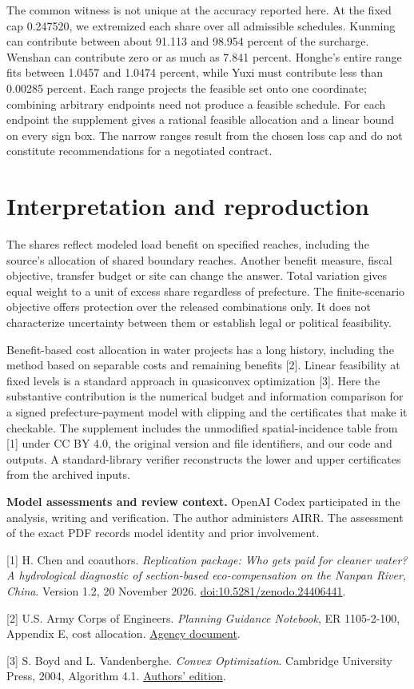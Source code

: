 \documentclass[11pt]{article}
\begin{document}
The common witness is not unique at the accuracy reported here. At the fixed cap 0.247520, we extremized each share over all admissible schedules. Kunming can contribute between about 91.113 and 98.954 percent of the surcharge. Wenshan can contribute zero or as much as 7.841 percent. Honghe's entire range fits between 1.0457 and 1.0474 percent, while Yuxi must contribute less than 0.00285 percent. Each range projects the feasible set onto one coordinate; combining arbitrary endpoints need not produce a feasible schedule. For each endpoint the supplement gives a rational feasible allocation and a linear bound on every sign box. The narrow ranges result from the chosen loss cap and do not constitute recommendations for a negotiated contract.

\clearpage
\section{Interpretation and reproduction}
The shares reflect modeled load benefit on specified reaches, including the source's allocation of shared boundary reaches. Another benefit measure, fiscal objective, transfer budget or site can change the answer. Total variation gives equal weight to a unit of excess share regardless of prefecture. The finite-scenario objective offers protection over the released combinations only. It does not characterize uncertainty between them or establish legal or political feasibility.

Benefit-based cost allocation in water projects has a long history, including the method based on separable costs and remaining benefits [2]. Linear feasibility at fixed levels is a standard approach in quasiconvex optimization [3]. Here the substantive contribution is the numerical budget and information comparison for a signed prefecture-payment model with clipping and the certificates that make it checkable. The supplement includes the unmodified spatial-incidence table from [1] under CC BY 4.0, the original version and file identifiers, and our code and outputs. A standard-library verifier reconstructs the lower and upper certificates from the archived inputs.

\textbf{Model assessments and review context.} OpenAI Codex participated in the analysis, writing and verification. The author administers AIRR. The assessment of the exact PDF records model identity and prior involvement.
\par\small
[1] H. Chen and coauthors. \emph{Replication package: Who gets paid for cleaner water? A hydrological diagnostic of section-based eco-compensation on the Nanpan River, China}. Version 1.2, 20 November 2026. \href{https://doi.org/10.5281/zenodo.24406441}{doi:10.5281/zenodo.24406441}.

[2] U.S. Army Corps of Engineers. \emph{Planning Guidance Notebook}, ER 1105-2-100, Appendix E, cost allocation. \href{https://www.publications.usace.army.mil/portals/76/publications/engineerregulations/er_1105-2-100.pdf}{Agency document}.

[3] S. Boyd and L. Vandenberghe. \emph{Convex Optimization}. Cambridge University Press, 2004, Algorithm 4.1. \href{https://stanford.edu/~boyd/cvxbook/}{Authors' edition}.
\end{document}
